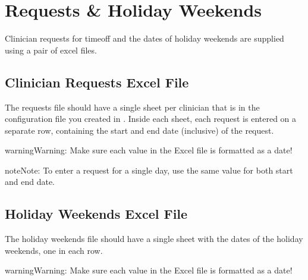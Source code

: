 \documentclass[letterpaper,10pt,english]{sphinxmanual}
\begin{document}
\chapter{Requests \& Holiday Weekends}
\label{\detokenize{manual:requests-holiday-weekends}}\label{\detokenize{manual:requests-and-holidays}}
Clinician requests for time\sphinxhyphen{}off and the dates of holiday weekends are
supplied using a pair of excel files.


\section{Clinician Requests Excel File}
\label{\detokenize{manual:clinician-requests-excel-file}}
The requests file should have a single sheet per clinician that is in the
configuration file you created in {\hyperref[\detokenize{manual:clinician-configuration}]{}}. Inside
each sheet, each request is entered on a separate row, containing the start
and end date (inclusive) of the request.

\begin{sphinxadmonition}{warning}{Warning:}
Make sure each value in the Excel file is formatted as a date!
\end{sphinxadmonition}

\begin{figure}[H]
\centering

\end{figure}

\begin{sphinxadmonition}{note}{Note:}
To enter a request for a single day, use the same value for both start
and end date.
\end{sphinxadmonition}


\section{Holiday Weekends Excel File}
\label{\detokenize{manual:holiday-weekends-excel-file}}
The holiday weekends file should have a single sheet with the dates of the
holiday weekends, one in each row.

\begin{sphinxadmonition}{warning}{Warning:}
Make sure each value in the Excel file is formatted as a date!
\end{sphinxadmonition}
\end{document}
